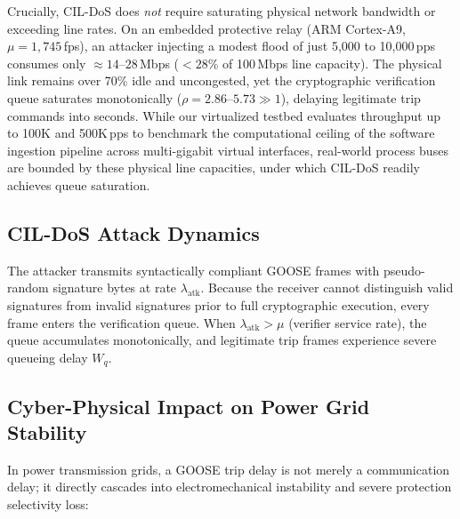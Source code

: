 \documentclass[journal]{IEEEtran}
\begin{document}
Crucially, CIL-DoS does \emph{not} require saturating physical network bandwidth or exceeding line rates. On an embedded protective relay (ARM Cortex-A9, $\mu = 1{,}745$\,fps), an attacker injecting a modest flood of just 5,000 to 10,000\,pps consumes only $\approx 14\text{--}28$\,Mbps ($<28\%$ of 100\,Mbps line capacity). The physical link remains over 70\% idle and uncongested, yet the cryptographic verification queue saturates monotonically ($\rho = 2.86\text{--}5.73 \gg 1$), delaying legitimate trip commands into seconds. While our virtualized testbed evaluates throughput up to 100K and 500K\,pps to benchmark the computational ceiling of the software ingestion pipeline across multi-gigabit virtual interfaces, real-world process buses are bounded by these physical line capacities, under which CIL-DoS readily achieves queue saturation.

\subsection{CIL-DoS Attack Dynamics}
The attacker transmits syntactically compliant GOOSE frames with pseudo-random signature bytes at rate $\lambda_{\text{atk}}$. Because the receiver cannot distinguish valid signatures from invalid signatures prior to full cryptographic execution, every frame enters the verification queue. When $\lambda_{\text{atk}} > \mu$ (verifier service rate), the queue accumulates monotonically, and legitimate trip frames experience severe queueing delay $W_q$.

\subsection{Cyber-Physical Impact on Power Grid Stability}
\label{sec:cyber_physical}
In power transmission grids, a GOOSE trip delay is not merely a communication delay; it directly cascades into electromechanical instability and severe protection selectivity loss:
\end{document}
